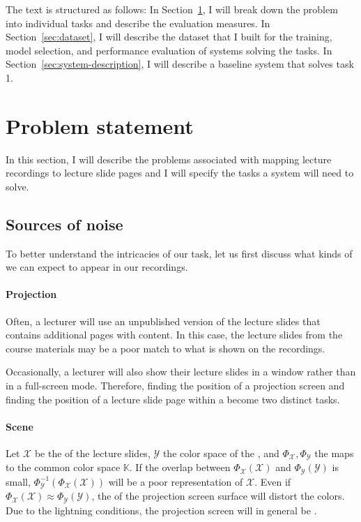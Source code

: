 The text is structured as follows: In Section~\ref{sec:problem}, I will
break down the problem into individual tasks and describe the evaluation
measures. In Section~\ref{sec:dataset}, I will describe the dataset
that I built for the training, model selection, and performance evaluation
of systems solving the tasks. In Section~\ref{sec:system-description},
I will describe a baseline system that solves task 1.


\section{Problem statement}
\label{sec:problem}
In this section, I will describe the problems associated with mapping lecture
recordings to lecture slide pages and I will specify the tasks a system will
need to solve.

\subsection{Sources of noise}
\label{sec:noise}
To better understand the intricacies of our task, let us first discuss what
kinds of  we can expect to appear in our recordings.

\paragraph{Projection} Often, a lecturer will use an unpublished version of the
lecture slides that contains additional pages with 
content. In this case, the lecture slides from the course materials may be a
poor match to what is shown on the recordings.

Occasionally, a lecturer will also show their lecture slides in a window rather
than in a full-screen mode. Therefore, finding the position of a projection
screen and finding the position of a lecture slide page within a
 become two distinct tasks.

\paragraph{Scene} Let $\mathcal X$ be the  of the lecture
slides, $\mathcal Y$ the color space of the , and
$\Phi_{\mathcal X},\Phi_{\mathcal Y}$ the maps to the common color space
$\mathbb K$. If the overlap between $\Phi_{\mathcal X}(\mathcal X)$ and
$\Phi_{\mathcal Y}(\mathcal Y)$ is small, $\Phi^{-1}_{\mathcal
Y}(\Phi_{\mathcal X}(\mathcal X))$ will be a poor representation of $\mathcal
X$. Even if $\Phi_{\mathcal X}(\mathcal X)\approx\Phi_{\mathcal Y}(\mathcal
Y)$, the  of the projection screen surface will distort the
colors.
Due to the lightning conditions, the projection screen will in general be
.

